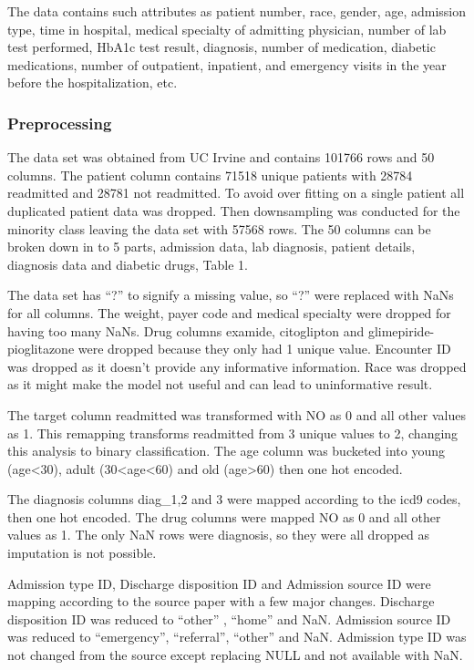 \documentclass[5p]{elsarticle} %
\begin{document}
The data contains such attributes as patient number, race, gender, age,
admission type, time in hospital, medical specialty of admitting
physician, number of lab test performed, HbA1c test result, diagnosis,
number of medication, diabetic medications, number of outpatient,
inpatient, and emergency visits in the year before the hospitalization,
etc.

\hypertarget{preprocessing}{%
\subsubsection{Preprocessing}\label{preprocessing}}

The data set was obtained from UC Irvine and contains 101766 rows and 50
columns. The patient column contains 71518 unique patients with 28784
readmitted and 28781 not readmitted. To avoid over fitting on a single
patient all duplicated patient data was dropped. Then downsampling was
conducted for the minority class leaving the data set with 57568 rows.
The 50 columns can be broken down in to 5 parts, admission data, lab
diagnosis, patient details, diagnosis data and diabetic drugs, Table 1.

The data set has ``?'' to signify a missing value, so ``?'' were
replaced with NaNs for all columns. The weight, payer code and medical
specialty were dropped for having too many NaNs. Drug columns examide,
citoglipton and glimepiride-pioglitazone were dropped because they only
had 1 unique value. Encounter ID was dropped as it doesn't provide any
informative information. Race was dropped as it might make the model not
useful and can lead to uninformative result.

The target column readmitted was transformed with NO as 0 and all other
values as 1. This remapping transforms readmitted from 3 unique values
to 2, changing this analysis to binary classification. The age column
was bucketed into young (age\textless30), adult
(30\textless age\textless60) and old (age\textgreater60) then one hot
encoded.

The diagnosis columns diag\_1,2 and 3 were mapped according to the icd9
codes, then one hot encoded. The drug columns were mapped NO as 0 and
all other values as 1. The only NaN rows were diagnosis, so they were
all dropped as imputation is not possible.

Admission type ID, Discharge disposition ID and Admission source ID were
mapping according to the source paper with a few major changes.
Discharge disposition ID was reduced to ``other'' , ``home'' and NaN.
Admission source ID was reduced to ``emergency'', ``referral'',
``other'' and NaN. Admission type ID was not changed from the source
except replacing NULL and not available with NaN.
\end{document}
